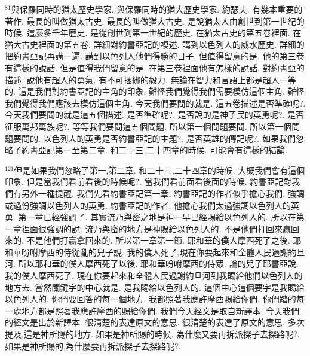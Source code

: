 \documentclass{book}
\begin{document}
$^{81}$與保羅同時的猶太歷史學家.
與保羅同時的猶大歷史學家.
約瑟夫.
有幾本重要的著作.
最長的叫做猶太古史.
最長的叫做猶大古史.
是說猶太人由創世到第一世紀的時候.
這麼多千年歷史.
是從創世到第一世紀的歷史.
在猶太古史的第五卷裡面.
在猶大古史裡面的第五卷.
詳細對約書亞記的複述.
講到以色列人的威水歷史.
詳細的把約書亞記再講一遍.
講到以色列人他們得勝的日子.
但值得留意的是.
他的第三卷有這樣的說話.
但是值得我們留意的是.
在第三卷裡面他有怎樣的說話.
對約書亞的描述.
說他有超人的勇氣.
有不可捆綁的毅力.
無論在智力和言語上都是超人一等的.
這是我們對約書亞記的主角的印象.
難怪我們覺得我們需要模仿這個主角.
難怪我們覺得我們應該去模仿這個主角.
今天我們要問的就是.
這五卷描述是否準確呢?.
今天我們要問的就是這五個描述.
是否準確呢?.
是否說的是神子民的英勇呢?.
是否征服萬邦萬族呢?.
等等我們要問這五個問題.
所以第一個問題要問.
所以第一個問題要問的.
以色列人的英勇是否約書亞記的主題?.
是否英雄的傳記呢?.
如果我們忽略了約書亞記第一至第二章.
和二十三,二十四章的時候.
可能會有這樣的結論.

$^{121}$但是如果我們忽略了第一,第二章.
和二十三,二十四章的時候.
大概我們會有這個印象.
但是當我們看前看後的時候呢?.
當我們看前面看後面的時候.
約書亞記對我們有另外一種提醒.
我們先看約書亞記第一章.
約書亞記的作者似乎擔心我們.
強調或過份強調以色列人的英勇.
約書亞記的作者.
他擔心我們太過強調以色列人的英勇.
第一章已經強調了.
其實流乃與密之地是神一早已經賜給以色列人的.
所以在第一章裡面很強調的說.
流乃與密的地方是神賜給以色列人的.
不是他們打回來贏回來的.
不是他們打贏拿回來的.
所以第一章第一節.
耶和華的僕人摩西死了之後.
耶和華吩咐摩西的侍從亂的兒子說.
我的僕人死了,現在你要起來和全體人民過謝約旦河.
所以耶和華的僕人摩西死了以後.
耶和華吩咐摩西的侍眾.
論的兒子耶書亞說.
我的僕人摩西死了.
現在你要起來和全體人民過謝約旦河到我賜給他們以色列人的地方去.
當然關鍵字的中心就是.
是我賜給以色列人的.
這個中心這個要字是我賜給以色列人的.
你們要回答的每一個地方.
我都照著我應許摩西賜給你們.
你們踏的每一處地方都是照著我應許摩西的賜給你們.
我們今天經文是取自新譯本.
今天我們的經文是出於新譯本.
很清楚的表達原文的意思.
很清楚的表達了原文的意思.
多次提及,這是神所賜的地方.
如果是神所賜的時候.
為什麼又要再拆派探子去探路呢?.
如果是神所賜的,為什麼要再拆派探子去探路呢?.
\end{document}
